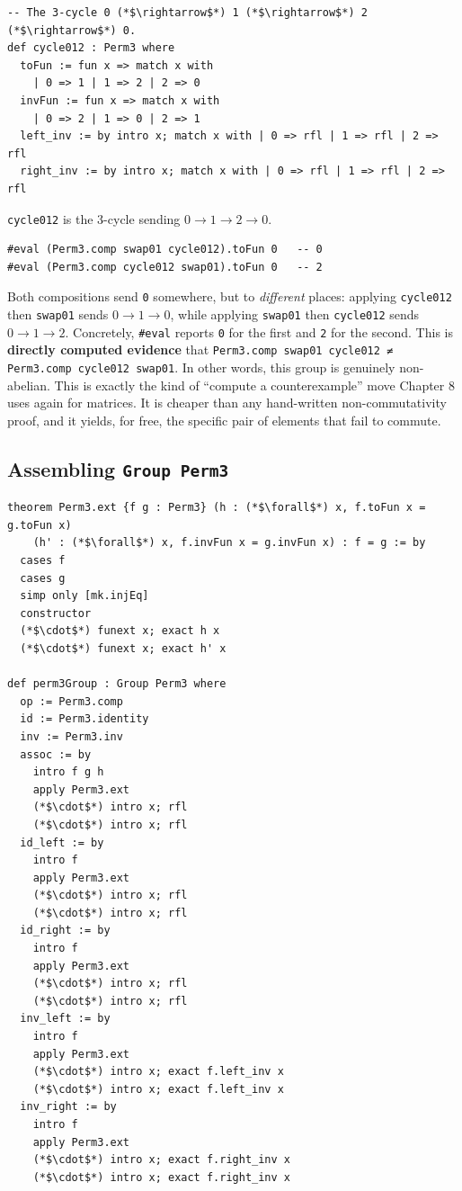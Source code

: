 \begin{lstlisting}
-- The 3-cycle 0 (*$\rightarrow$*) 1 (*$\rightarrow$*) 2 (*$\rightarrow$*) 0.
def cycle012 : Perm3 where
  toFun := fun x => match x with
    | 0 => 1 | 1 => 2 | 2 => 0
  invFun := fun x => match x with
    | 0 => 2 | 1 => 0 | 2 => 1
  left_inv := by intro x; match x with | 0 => rfl | 1 => rfl | 2 => rfl
  right_inv := by intro x; match x with | 0 => rfl | 1 => rfl | 2 => rfl
\end{lstlisting}

\texttt{cycle012} is the 3-cycle sending \(0 \to 1 \to 2 \to 0\).

\begin{lstlisting}
#eval (Perm3.comp swap01 cycle012).toFun 0   -- 0
#eval (Perm3.comp cycle012 swap01).toFun 0   -- 2
\end{lstlisting}

Both compositions send \texttt{0} somewhere, but to \emph{different} places: applying \texttt{cycle012} then \texttt{swap01} sends \(0 \to 1 \to 0\), while applying \texttt{swap01} then \texttt{cycle012} sends \(0 \to 1 \to 2\). Concretely, \texttt{\#eval} reports \texttt{0} for the first and \texttt{2} for the second. This is \textbf{directly computed evidence} that \texttt{Perm3.comp swap01 cycle012 ≠ Perm3.comp cycle012 swap01}. In other words, this group is genuinely non-abelian. This is exactly the kind of ``compute a counterexample'' move Chapter 8 uses again for matrices. It is cheaper than any hand-written non-commutativity proof, and it yields, for free, the specific pair of elements that fail to commute.

\subsection{\texorpdfstring{Assembling \texttt{Group\ Perm3}}{Assembling Group Perm3}}\label{sec:06-groups:04-permutations-example:5}

\begin{lstlisting}
theorem Perm3.ext {f g : Perm3} (h : (*$\forall$*) x, f.toFun x = g.toFun x)
    (h' : (*$\forall$*) x, f.invFun x = g.invFun x) : f = g := by
  cases f
  cases g
  simp only [mk.injEq]
  constructor
  (*$\cdot$*) funext x; exact h x
  (*$\cdot$*) funext x; exact h' x

def perm3Group : Group Perm3 where
  op := Perm3.comp
  id := Perm3.identity
  inv := Perm3.inv
  assoc := by
    intro f g h
    apply Perm3.ext
    (*$\cdot$*) intro x; rfl
    (*$\cdot$*) intro x; rfl
  id_left := by
    intro f
    apply Perm3.ext
    (*$\cdot$*) intro x; rfl
    (*$\cdot$*) intro x; rfl
  id_right := by
    intro f
    apply Perm3.ext
    (*$\cdot$*) intro x; rfl
    (*$\cdot$*) intro x; rfl
  inv_left := by
    intro f
    apply Perm3.ext
    (*$\cdot$*) intro x; exact f.left_inv x
    (*$\cdot$*) intro x; exact f.left_inv x
  inv_right := by
    intro f
    apply Perm3.ext
    (*$\cdot$*) intro x; exact f.right_inv x
    (*$\cdot$*) intro x; exact f.right_inv x
\end{lstlisting}

